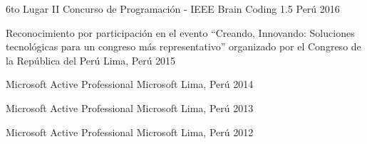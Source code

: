 



\begin{cvhonors}

  \cvhonor
    {6to Lugar} %
    {II Concurso de Programación - IEEE Brain Coding 1.5} %
    {Perú} %
    {2016} %

  \cvhonor
    {Reconocimiento} %
    {por participación en el evento ``Creando, Innovando: Soluciones tecnológicas para un congreso más representativo'' organizado por el Congreso de la República del Perú} %
    {Lima, Perú} %
    {2015} %

  \cvhonor
    {Microsoft Active Professional} %
    {Microsoft} %
    {Lima, Perú} %
    {2014} %

  \cvhonor
    {Microsoft Active Professional} %
    {Microsoft} %
    {Lima, Perú} %
    {2013} %

  \cvhonor
    {Microsoft Active Professional} %
    {Microsoft} %
    {Lima, Perú} %
    {2012} %

\end{cvhonors}
